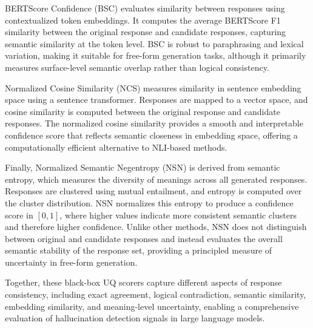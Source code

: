 BERTScore Confidence (BSC) evaluates similarity between responses using contextualized token embeddings. It computes the average BERTScore F1 similarity between the original response and candidate responses, capturing semantic similarity at the token level. BSC is robust to paraphrasing and lexical variation, making it suitable for free-form generation tasks, although it primarily measures surface-level semantic overlap rather than logical consistency.

Normalized Cosine Similarity (NCS) measures similarity in sentence embedding space using a sentence transformer. Responses are mapped to a vector space, and cosine similarity is computed between the original response and candidate responses. The normalized cosine similarity provides a smooth and interpretable confidence score that reflects semantic closeness in embedding space, offering a computationally efficient alternative to NLI-based methods.

Finally, Normalized Semantic Negentropy (NSN) is derived from semantic entropy, which measures the diversity of meanings across all generated responses. Responses are clustered using mutual entailment, and entropy is computed over the cluster distribution. NSN normalizes this entropy to produce a confidence score in $[0,1]$, where higher values indicate more consistent semantic clusters and therefore higher confidence. Unlike other methods, NSN does not distinguish between original and candidate responses and instead evaluates the overall semantic stability of the response set, providing a principled measure of uncertainty in free-form generation.

Together, these black-box UQ scorers capture different aspects of response consistency, including exact agreement, logical contradiction, semantic similarity, embedding similarity, and meaning-level uncertainty, enabling a comprehensive evaluation of hallucination detection signals in large language models.


